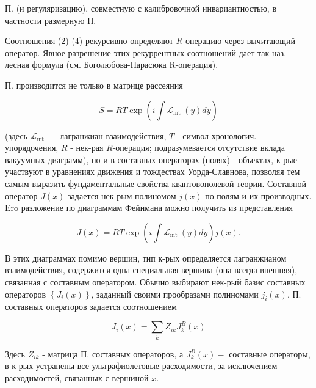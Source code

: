 \documentclass[10pt]{article}
\begin{document}
П. (и регуляризацию), совместную с калибровочной инвариантностью, в частности размерную П.



Соотношения (2)-(4) рекурсивно определяют $R$-операцию через вычитающий оператор. Явное разрешение этих рекуррентных соотношений дает так наз. лесная формула (см. Боголюбова-Парасюка R-операция).



П. производится не только в матрице рассеяния



\[

S=R T \exp \left(i \int \mathscr{L}_{\text {int }}(y) d y\right)

\]



(здесь $\mathscr{L}_{\text {int }}-$ лагранжиан взаимодействия, $T$ - символ хронологич. упорядочения, $R$ - нек-рая $R$-операция; подразумевается отсутствие вклада вакуумных диаграмм), но и в составных операторах (полях) - объектах, к-рые участвуют в уравнениях движения и тождествах Уорда-Славнова, позволяя тем самым выразить фундаментальные свойства квантовополевой теории. Составной оператор $J(x)$ задается нек-рым полиномом $j(x)$ по полям и их производных. Ero разложение по диаграммам Фейнмана можно получить из представления



\[

J(x)=R T \exp \left(i \int \mathscr{L}_{\text {int }}(y) d y\right) j(x) .

\]



В этих диаграммах помимо вершин, тип к-рых определяется лагранжианом взаимодействия, содержится одна специальная вершина (она всегда внешняя), связанная с составным оператором. Обычно выбирают нек-рый базис составных операторов $\left\{J_{i}(x)\right\}$, заданный своими прообразами полиномами $j_{i}(x)$. П. составных операторов задается соотношением



\[

J_{i}(x)=\sum_{k} Z_{i k} J_{k}^{B}(x)

\]



Здесь $Z_{i k}$ - матрица П. составных операторов, а $J_{k}^{B}(x)-$ составные операторы, в к-рых устранены все ультрафиолетовые расходимости, за исключением расходимостей, связанных с вершиной $x$.
\end{document}
